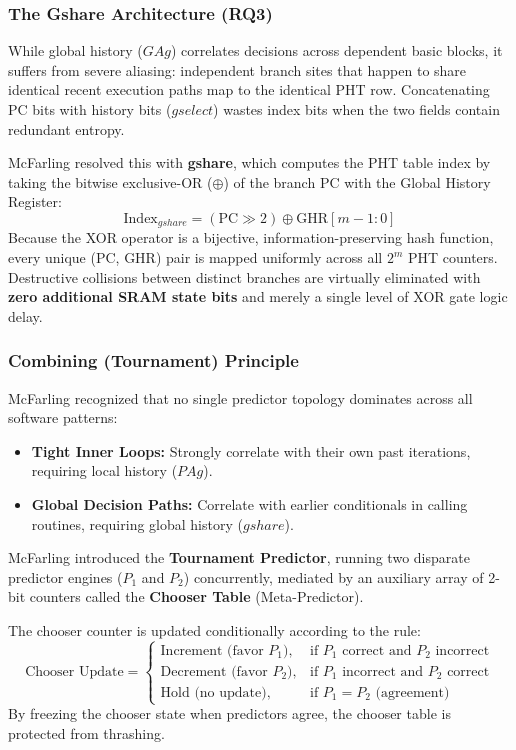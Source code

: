 \documentclass[11pt,a4paper]{article}
\begin{document}
\subsubsection{The Gshare Architecture (RQ3)}
While global history ($GAg$) correlates decisions across dependent basic blocks, it suffers from severe aliasing: independent branch sites that happen to share identical recent execution paths map to the identical PHT row. Concatenating PC bits with history bits ($gselect$) wastes index bits when the two fields contain redundant entropy.

McFarling resolved this with \textbf{gshare}, which computes the PHT table index by taking the bitwise exclusive-OR ($\oplus$) of the branch PC with the Global History Register:
\begin{equation}
    \text{Index}_{gshare} = \left(\text{PC} \gg 2\right) \oplus \text{GHR}[m-1:0]
    \label{eq:gshare}
\end{equation}
Because the XOR operator is a bijective, information-preserving hash function, every unique (PC, GHR) pair is mapped uniformly across all $2^m$ PHT counters. Destructive collisions between distinct branches are virtually eliminated with \textbf{zero additional SRAM state bits} and merely a single level of XOR gate logic delay.

\subsubsection{Combining (Tournament) Principle}
McFarling recognized that no single predictor topology dominates across all software patterns:
\begin{itemize}[leftmargin=1.5em, itemsep=0.3em]
    \item \textbf{Tight Inner Loops:} Strongly correlate with their own past iterations, requiring local history ($PAg$).
    \item \textbf{Global Decision Paths:} Correlate with earlier conditionals in calling routines, requiring global history ($gshare$).
\end{itemize}
McFarling introduced the \textbf{Tournament Predictor}, running two disparate predictor engines ($P_1$ and $P_2$) concurrently, mediated by an auxiliary array of 2-bit counters called the \textbf{Chooser Table} (Meta-Predictor).

The chooser counter is updated conditionally according to the rule:
\begin{equation}
    \text{Chooser Update} = 
    \begin{cases} 
      \text{Increment (favor } P_1\text{)}, & \text{if } P_1 \text{ correct and } P_2 \text{ incorrect} \\
      \text{Decrement (favor } P_2\text{)}, & \text{if } P_1 \text{ incorrect and } P_2 \text{ correct} \\
      \text{Hold (no update)}, & \text{if } P_1 = P_2 \text{ (agreement)}
    \end{cases}
    \label{eq:chooser_rule}
\end{equation}
By freezing the chooser state when predictors agree, the chooser table is protected from thrashing.
\end{document}
